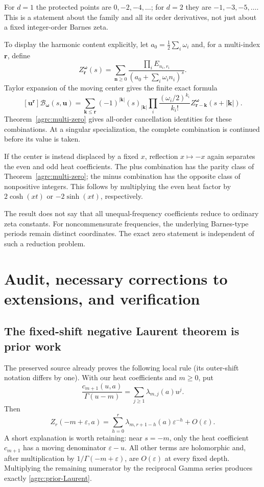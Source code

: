\documentclass[11pt]{article}
\numberwithin{equation}{section}
\theoremstyle{definition}\newtheorem{definition}[theorem]{Definition}
\theoremstyle{remark}\newtheorem{remark}[theorem]{Remark}
\newcommand{\Bcal}{\mathcal B}
\begin{document}
For $d=1$ the protected points are $0,-2,-4,\ldots$; for $d=2$ they
are $-1,-3,-5,\ldots$. This is a statement about the family and all its
order derivatives, not just about a fixed integer-order Barnes zeta.

To display the harmonic content explicitly, let
$a_0=\frac12\sum_i\omega_i$ and, for a multi-index $\bm r$, define
\[
 Z_{\bm r}^{\bm\omega}(s)=
 \sum_{\bm n\geq0}\frac{\prod_i E_{n_i,r_i}}
                         {(a_0+\sum_i\omega_i n_i)^s}.
\]
Taylor expansion of the moving center gives the finite exact formula
\begin{equation}\label{agrc:multi-coeff}
 [\bm u^{\bm r}]\Bcal_{\bm\omega}(s,\bm u)
 =\sum_{\bm k\leq\bm r}(-1)^{|\bm k|}(s)_{|\bm k|}
       \prod_i\frac{(\omega_i/2)^{k_i}}{k_i!}
          Z_{\bm r-\bm k}^{\bm\omega}(s+|\bm k|).
\end{equation}
Theorem~\ref{agrc:multi-zero} gives all-order cancellation identities
for these combinations. At a singular specialization, the complete
combination is continued before its value is taken.

If the center is instead displaced by a fixed $x$, reflection
$x\mapsto-x$ again separates the even and odd heat coefficients.
The plus combination has the parity class of Theorem~\ref{agrc:multi-zero};
the minus combination has the opposite class of nonpositive integers.
This follows by multiplying the even heat factor by $2\cosh(xt)$ or
$-2\sinh(xt)$, respectively.

The result does not say that all unequal-frequency coefficients reduce
to ordinary zeta constants. For noncommensurate frequencies, the
underlying Barnes-type periods remain distinct coordinates. The exact
zero statement is independent of such a reduction problem.

\section{Audit, necessary corrections to extensions, and verification}
\label{agrc:audit-section}

\subsection{The fixed-shift negative Laurent theorem is prior work}

The preserved source \cite{repo-laurent} already proves the following
local rule (its outer-shift notation differs by one). With our heat
coefficients and $m\geq0$, put
\[
 \frac{c_{m+1}(u,a)}{\Gamma(u-m)}
       =\sum_{j\geq1}\lambda_{m,j}(a)u^j.
\]
Then
\begin{equation}\label{agrc:prior-Laurent}
 Z_r(-m+\varepsilon,a)
 =\sum_{h=0}^r\lambda_{m,r+1-h}(a)\varepsilon^{-h}
        +O(\varepsilon).
\end{equation}
A short explanation is worth retaining: near $s=-m$, only the heat
coefficient $c_{m+1}$ has a moving denominator $\varepsilon-u$.
All other terms are holomorphic and, after multiplication by
$1/\Gamma(-m+\varepsilon)$, are $O(\varepsilon)$ at every fixed depth.
Multiplying the remaining numerator by the reciprocal Gamma series
produces exactly \eqref{agrc:prior-Laurent}.
\end{document}
